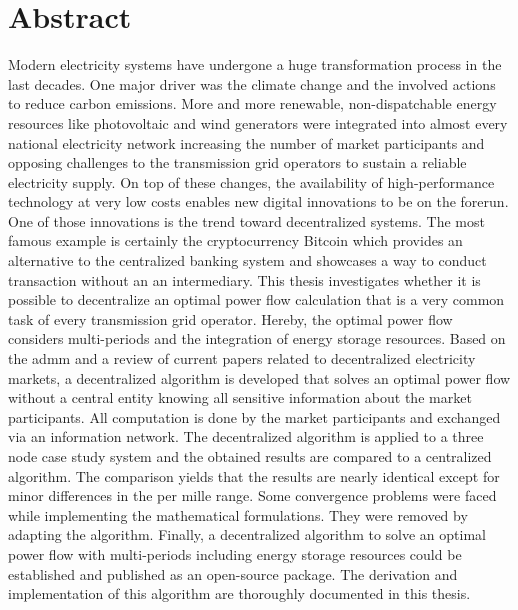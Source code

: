 \section*{Abstract}

Modern electricity systems have undergone a huge transformation process in the last decades. One major driver was the climate change and the involved actions to reduce carbon emissions. More and more renewable, non-dispatchable energy resources like photovoltaic and wind generators were integrated into almost every national electricity network increasing the number of market participants and opposing challenges to the transmission grid operators to sustain a reliable electricity supply. On top of these changes, the availability of high-performance technology at very low costs enables new digital innovations to be on the forerun. One of those innovations is the trend toward decentralized systems. The most famous example is certainly the cryptocurrency Bitcoin which provides an alternative to the centralized banking system and showcases a way to conduct transaction without an an intermediary. This thesis investigates whether it is possible to decentralize an optimal power flow calculation that is a very common task of every transmission grid operator. Hereby, the optimal power flow considers multi-periods and the integration of energy storage resources. Based on the \gls{admm} and a review of current papers related to decentralized electricity markets, a decentralized algorithm is developed that solves an optimal power flow without a central entity knowing all sensitive information about the market participants. All computation is done by the market participants and exchanged via an information network. The decentralized algorithm is applied to a three node case study system and the obtained results are compared to a centralized algorithm. The comparison yields that the results are nearly identical except for minor differences in the per mille range. Some convergence problems were faced while implementing the mathematical formulations. They were removed by adapting the algorithm. Finally, a decentralized algorithm to solve an optimal power flow with multi-periods including energy storage resources could be established and published as an open-source package. The derivation and implementation of this algorithm are thoroughly documented in this thesis.